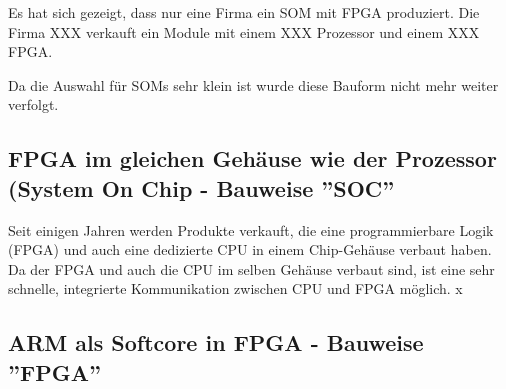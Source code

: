 Es hat sich gezeigt, dass nur eine Firma ein SOM mit FPGA produziert.
Die Firma XXX verkauft ein Module mit einem XXX Prozessor und einem XXX FPGA.


Da die Auswahl für SOMs sehr klein ist wurde diese Bauform nicht mehr weiter verfolgt.

 
\subsection{FPGA im gleichen Gehäuse wie der Prozessor (System On Chip - Bauweise ''SOC''}
Seit einigen Jahren werden Produkte verkauft, die eine programmierbare Logik (FPGA) und auch eine dedizierte CPU in einem Chip-Gehäuse verbaut haben.
Da der FPGA und auch die CPU im selben Gehäuse verbaut sind, ist eine sehr schnelle, integrierte Kommunikation zwischen CPU und FPGA möglich.
x

\subsection{ARM als Softcore in FPGA - Bauweise ''FPGA''}

